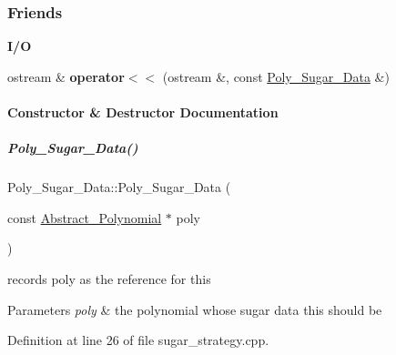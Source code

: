 \subsubsection*{Friends}
\begin{Indent}\textbf{ I/O}\par
\begin{DoxyCompactItemize}
\item 
\mbox{\label{group__strategygroup_ade466c9119513ef40b2b6220a98a72e6}} 
ostream \& {\bfseries operator$<$$<$} (ostream \&, const \hyperlink{group__strategygroup_class_poly___sugar___data}{Poly\+\_\+\+Sugar\+\_\+\+Data} \&)
\end{DoxyCompactItemize}
\end{Indent}


\paragraph{Constructor \& Destructor Documentation}
\mbox{\label{group__strategygroup_a0d9e2f66a44f2e10d26b977c55650f7f}} 
\subparagraph{\texorpdfstring{Poly\+\_\+\+Sugar\+\_\+\+Data()}{Poly\_Sugar\_Data()}}
{\footnotesize\ttfamily Poly\+\_\+\+Sugar\+\_\+\+Data\+::\+Poly\+\_\+\+Sugar\+\_\+\+Data (\begin{DoxyParamCaption}\item[{const \hyperlink{group__polygroup_class_abstract___polynomial}{Abstract\+\_\+\+Polynomial} $\ast$}]{poly }\end{DoxyParamCaption})}



records {\ttfamily poly} as the reference for {\ttfamily this} 


\begin{DoxyParams}{Parameters}
{\em poly} & the polynomial whose sugar data {\ttfamily this} should be \\
\hline
\end{DoxyParams}


Definition at line 26 of file sugar\+\_\+strategy.\+cpp.




